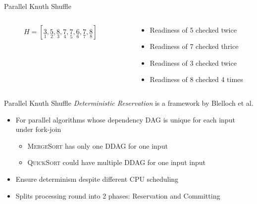 \begin{frame}{Parallel Knuth Shuffle}
  \begin{columns}
    \begin{column}{0.4\textwidth}
      \begin{figure}
        \begin{center}
        \end{center}
        \caption{\(H = [
          \underset{1}{3}, 
          \underset{2}{5}, 
          \underset{3}{8}, 
          \underset{4}{7}, 
          \underset{5}{7}, 
          \underset{6}{6}, 
          \underset{7}{7}, 
          \underset{8}{8} 
        ]\)}
      \end{figure}
    \end{column}
    \begin{column}{0.6\textwidth}
      \begin{itemize}
        \item Readiness of 5 checked twice
        \item Readiness of 7 checked thrice
        \item Readiness of 3 checked twice
        \item Readiness of 8 checked 4 times
      \end{itemize}
    \end{column}
  \end{columns}
\end{frame}

\begin{frame}{Parallel Knuth Shuffle}
  \textit{Deterministic Reservation} is a framework by Blelloch et al. 
  \cite{blelloch-detreserve}
  \begin{itemize}
    \item For parallel algorithms whose dependency DAG is
      unique for each input under fork-join
      \begin{itemize}
        \item \textsc{MergeSort} has only one DDAG for one input
        \item \textsc{QuickSort} could have multiple DDAG for one input
          input
      \end{itemize}
    \item Ensure determinism despite different CPU scheduling
    \item Splits processing round into 2 phases: Reservation and Committing
  \end{itemize}
\end{frame}

